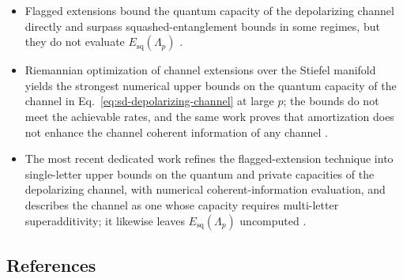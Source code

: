 \begin{itemize}
  \item Flagged extensions bound the quantum capacity of the depolarizing channel
  directly and surpass squashed-entanglement bounds in some regimes, but they
  do not evaluate $E_{\mathrm{sq}}(\Lambda_p)$
  .

  \item Riemannian optimization of channel extensions over the Stiefel manifold
  yields the strongest numerical upper bounds on the quantum capacity of the
  channel in Eq.~\eqref{eq:sd-depolarizing-channel} at large $p$; the bounds
  do not meet the achievable rates, and the same work proves that
  amortization does not enhance the channel coherent information of any
  channel .

  \item The most recent dedicated work refines the flagged-extension technique
  into single-letter upper bounds on the quantum and private capacities of
  the depolarizing channel, with numerical coherent-information evaluation,
  and describes the channel as one whose capacity requires multi-letter
  superadditivity; it likewise leaves $E_{\mathrm{sq}}(\Lambda_p)$ uncomputed
  .
\end{itemize}

\subsection*{References}

